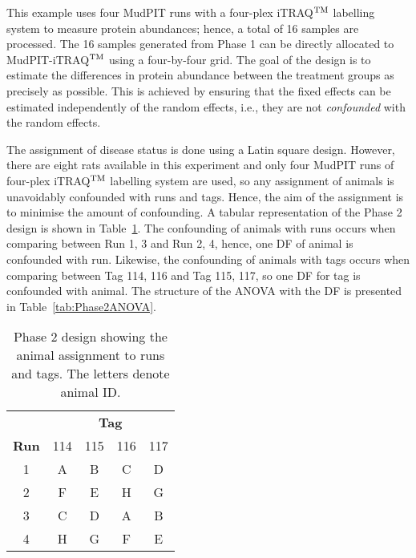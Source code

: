 \documentclass[article]{jss}
\begin{document}
This example uses four MudPIT runs with a four-plex iTRAQ$^{\rm TM}$ labelling system to measure protein abundances; hence, a total of 16 samples are processed. The 16 samples generated from Phase 1 can be directly allocated to MudPIT-iTRAQ$^{\rm TM}$ using a four-by-four grid. The goal of the design is to estimate the differences in protein abundance between the treatment groups as precisely as possible. This is achieved by ensuring that the fixed effects can be estimated independently of the random effects, i.e., they are not \emph{confounded} with the random effects.

The assignment of disease status is done using a Latin square design. However, there are eight rats available in this experiment and only four MudPIT runs of four-plex iTRAQ$^{\rm TM}$ labelling system are used, so any assignment of animals is unavoidably confounded with runs and tags. Hence, the aim of the assignment is to minimise the amount of confounding. A tabular representation of the Phase 2 design is shown in Table~\ref{tab:phase2Design}. The confounding of animals with runs occurs when comparing between Run 1, 3 and Run 2, 4, hence, one DF of animal is confounded with run. Likewise, the confounding of animals with tags occurs when comparing between Tag 114, 116 and Tag 115, 117, so one DF for tag is confounded with animal. The structure of the ANOVA with the DF is presented in Table~\ref{tab:Phase2ANOVA}.

\begin{table}[ht]
\centering
\caption{Phase 2 design showing the animal assignment to runs and tags. The letters denote animal ID.}
\begin{tabular}[t]{c|cccc}
 & \multicolumn{4}{c}{{\bf Tag}} \\
{\bf Run}  & 114 & 115 & 116 & 117 \\ 
\hline 
1 & A & B & C & D \\ 
2 & F & E & H & G \\ 
3 & C & D & A & B \\ 
4 & H & G & F & E \\ 
\end{tabular} 
\label{tab:phase2Design}
\end{table}
\end{document}
